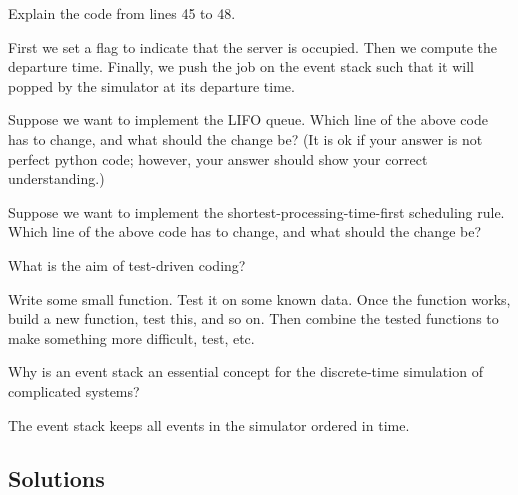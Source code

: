 \begin{exercise}[201907]
 Explain the code from lines 45 to 48.

\begin{solution}
  First we set a flag to indicate that the server is occupied.
  Then we compute the departure time.
  Finally, we push the job on the event stack such that it will popped by the simulator at its departure time.
\end{solution}
\end{exercise}              

\begin{exercise}[201907] 
Suppose we want to implement the LIFO queue. Which line of the above code has to change, and what should the change be? (It is ok if your answer is not perfect python code; however, your answer should show your correct understanding.) 

\begin{solution}
\end{solution}

\end{exercise}              

\begin{exercise}[201907] 
  Suppose we want to implement the shortest-processing-time-first scheduling rule.
  Which line of the above code has to change, and what should the change be?

\begin{solution}
\end{solution}
\end{exercise}              


\begin{exercise}[201907]
What is the aim of test-driven coding? 

\begin{solution}
  Write some small function.
  Test it on some known data.
  Once the function works, build a new function, test this, and so on.
  Then combine the tested functions to make something more difficult, test, etc.
\end{solution}
\end{exercise}

\begin{exercise}[201907]
  Why is an event stack an essential concept for the discrete-time simulation of complicated systems?

\begin{solution}
  The event stack keeps all events in the simulator ordered in time.
\end{solution}  
\end{exercise}

\subsection*{Solutions}




